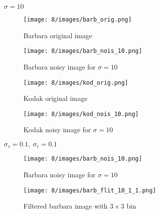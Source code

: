 \documentclass[12pt]{article}
\begin{document}
\begin{itemize}

    $\sigma = 10$
    \begin{figure}[H]
        \centering
        \begin{minipage}{.45\textwidth}
          \centering
          \texttt{[image: 8/images/barb\_orig.png]}
          \caption*{Barbara original image}
          \label{fig:totalpowervst}
        \end{minipage}
        \begin{minipage}{.45\textwidth}
          \centering
          \texttt{[image: 8/images/barb\_nois\_10.png]}
          \caption*{Barbara noisy image for $\sigma = 10$}
          \label{fig:totalpower2}
        \end{minipage}
        \label{fig:totalPower}
    \end{figure}
    
    \begin{figure}[H]
        \centering
        \begin{minipage}{.45\textwidth}
          \centering
          \texttt{[image: 8/images/kod\_orig.png]}
          \caption*{Kodak original image}
          \label{fig:totalpowervst}
        \end{minipage}
        \begin{minipage}{.45\textwidth}
          \centering
          \texttt{[image: 8/images/kod\_nois\_10.png]}
          \caption*{Kodak noisy image for $\sigma = 10$}
          \label{fig:totalpower2}
        \end{minipage}
        \label{fig:totalPower}
    \end{figure}
    
    $\sigma_s = 0.1, \ \sigma_r = 0.1$
    \begin{figure}[H]
        \centering
        \begin{minipage}{.45\textwidth}
          \centering
          \texttt{[image: 8/images/barb\_nois\_10.png]}
          \caption*{Barbara noisy image for $\sigma = 10$}
          \label{fig:totalpowervst}
        \end{minipage}
        \begin{minipage}{.45\textwidth}
          \centering
          \texttt{[image: 8/images/barb\_flit\_10\_1\_1.png]}
          \caption*{Filtered barbara image with $3\times 3$ bin}
          \label{fig:totalpower2}
        \end{minipage}
        \label{fig:totalPower}
    \end{figure}
    

\end{itemize}
\end{document}
